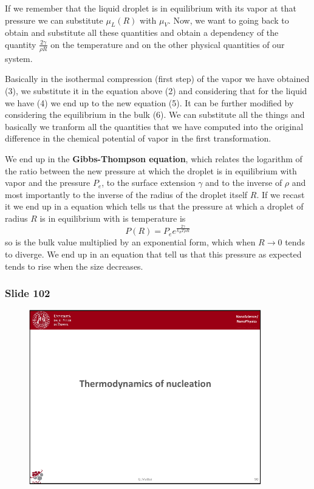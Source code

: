 \documentclass[../main/main.tex]{subfiles}
\begin{document}
If we remember that the liquid droplet is in equilibrium with its vapor at that pressure we can substitute \( \mu _L (R) \) with \( \mu _V  \). Now, we want to going back to obtain and substitute all these quantities and obtain a dependency of the quantity \( \frac{2 \gamma  }{\rho R} \) on the temperature and on the other physical quantities of our system.

Basically in the isothermal compression (first step) of the vapor we have obtained (3), we substitute it in the equation above (2) and considering that for the liquid we have (4) we end up to the new equation (5). It can be further modified by considering the equilibrium in the bulk (6). We can substitute all the things and basically we tranform all the quantities that we have computed into the original difference in the chemical potential of vapor in the first transformation.

We end up in the \textbf{Gibbs-Thompson equation}, which relates the logarithm of the ratio between the new pressure at which the droplet is in equilibrium with vapor and the pressure \( P_e \), to the surface extension \( \gamma   \)  and to the inverse of \( \rho  \) and most importantly to the inverse of the radius of the droplet itself \( R \). If we recast it we end up in a equation which tells us that the pressure at which a droplet of radius \( R \) is in equilibrium with is temperature is
\begin{equation*}
  P(R) = P_e e^{\frac{2 \gamma  }{k_B T \rho  R}}
\end{equation*}
so is the bulk value multiplied by an exponential form, which when \( R \rightarrow 0 \) tends to diverge. We end up in an equation that tell us that this pressure as expected tends to rise when the size decreases.

\newpage
\subsubsection{Slide 102}

\begin{figure}[h!]
\centering
\includegraphics[page=13,width=0.9\textwidth]{../lessons/pdf_file/6_lesson.pdf}
\end{figure}
\end{document}

